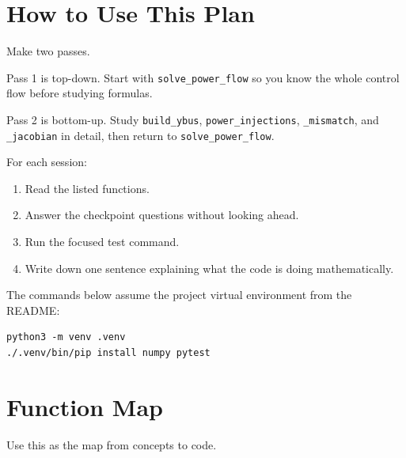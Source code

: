 \documentclass[11pt]{article}
\newcommand{\code}[1]{\texttt{#1}}
\begin{document}
\section{How to Use This Plan}

Make two passes.

Pass 1 is top-down. Start with \code{solve\_power\_flow} so you know the whole
control flow before studying formulas.

Pass 2 is bottom-up. Study \code{build\_ybus}, \code{power\_injections},
\code{\_mismatch}, and \code{\_jacobian} in detail, then return to
\code{solve\_power\_flow}.

For each session:

\begin{enumerate}
  \item Read the listed functions.
  \item Answer the checkpoint questions without looking ahead.
  \item Run the focused test command.
  \item Write down one sentence explaining what the code is doing
  mathematically.
\end{enumerate}

The commands below assume the project virtual environment from the README:

\begin{verbatim}
python3 -m venv .venv
./.venv/bin/pip install numpy pytest
\end{verbatim}

\section{Function Map}

Use this as the map from concepts to code.
\end{document}
